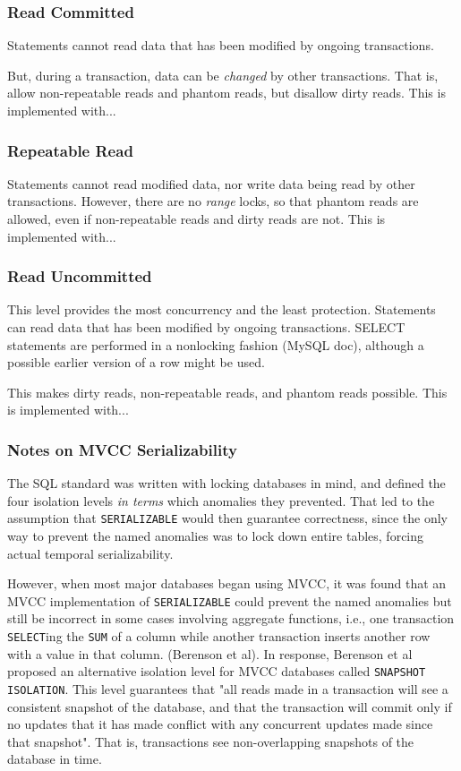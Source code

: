 \documentclass[12pt]{article} %
\begin{document}
\subsubsection{Read Committed}
Statements cannot read data that has been modified by ongoing transactions. 

But, during a transaction, data can be \textit{changed} by other transactions. That is, allow non-repeatable reads and phantom reads, but disallow dirty reads. This is implemented with...

\subsubsection{Repeatable Read}
Statements cannot read modified data, nor write data being read by other transactions. However, there are no \textit{range} locks, so that phantom reads are allowed, even if non-repeatable reads and dirty reads are not. This is implemented with...

\subsubsection{Read Uncommitted}
This level provides the most concurrency and the least protection. Statements can read data that has been modified by ongoing transactions. SELECT statements are performed in a nonlocking fashion (MySQL doc), although a possible earlier version of a row might be used. 

This makes dirty reads, non-repeatable reads, and phantom reads possible. This is implemented with...

\subsubsection{Notes on MVCC Serializability}
The SQL standard was written with locking databases in mind, and defined the four isolation levels \textit{in terms} which anomalies they prevented. That led to the assumption that \texttt{SERIALIZABLE} would then guarantee correctness, since the only way to prevent the named anomalies was to lock down entire tables, forcing actual temporal serializability.

However, when most major databases began using MVCC, it was found that an MVCC implementation of \texttt{SERIALIZABLE} could prevent the named anomalies but still be incorrect in some cases involving aggregate functions, i.e., one transaction \texttt{SELECT}ing the \texttt{SUM} of a column while another transaction inserts another row with a value in that column. (Berenson et al). In response, Berenson et al proposed an alternative isolation level for MVCC databases called \texttt{SNAPSHOT ISOLATION}. This level guarantees that "all reads made in a transaction will see a consistent snapshot of the database, and that the transaction will commit only if no updates that it has made conflict with any concurrent updates made since that snapshot". That is, transactions see non-overlapping snapshots of the database in time. 
\end{document}
